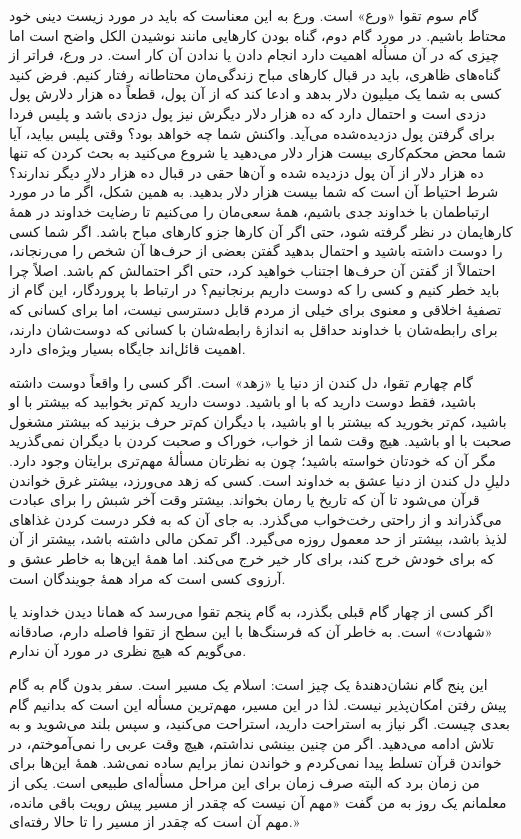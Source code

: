 گام سوم تقوا «ورع» است. ورع به این معناست که باید در مورد زیست دینی خود محتاط باشیم. در مورد گام دوم، گناه بودن کارهایی مانند نوشیدن الکل واضح است اما چیزی که در آن مسأله اهمیت دارد انجام دادن یا ندادن آن کار است. در ورع، فراتر از گناه‌های ظاهری، باید در قبال  کارهای مباح زندگی‌مان محتاطانه رفتار کنیم. فرض کنید کسی به شما یک میلیون دلار بدهد و ادعا کند که از آن پول، قطعاً ده هزار دلارش پول دزدی است و احتمال دارد که ده هزار دلار دیگرش نیز پول دزدی باشد و پلیس فردا برای گرفتن پول دزدیده‌شده می‌آید. واکنش شما چه خواهد بود؟ وقتی پلیس بیاید، آیا شما محض محکم‌کاری بیست هزار دلار می‌دهید یا شروع می‌کنید به بحث کردن که تنها ده هزار دلار از آن پول دزدیده شده و آن‌ها حقی در قبال ده هزار دلارِ دیگر ندارند؟ شرط احتیاط آن است که شما بیست هزار دلار بدهید. به همین شکل، اگر ما در مورد ارتباطمان با خداوند جدی باشیم، همهٔ سعی‌مان را می‌کنیم تا رضایت خداوند در همهٔ کارهایمان در نظر گرفته شود، حتی اگر آن کارها جزو کارهای مباح باشد. اگر شما کسی را دوست داشته باشید و احتمال بدهید گفتن بعضی از حرف‌ها آن شخص را می‌رنجاند، احتمالاً از گفتن آن حرف‌ها اجتناب خواهید کرد، حتی اگر احتمالش کم باشد. اصلاً چرا باید خطر کنیم و کسی را که دوست داریم برنجانیم؟ در ارتباط با پروردگار، این گام از تصفیهٔ اخلاقی و معنوی برای خیلی از مردم قابل دسترسی نیست، اما برای کسانی که برای  رابطه‌شان با خداوند حداقل به اندازهٔ رابطه‌شان با کسانی که دوست‌شان دارند، اهمیت قائل‌اند جایگاه بسیار ویژه‌ای دارد.

گام چهارم تقوا، دل کندن از دنیا یا «زهد» است. اگر کسی را واقعاً دوست داشته باشید، فقط دوست دارید که با او باشید. دوست دارید کم‌تر بخوابید که بیشتر با او باشید، کم‌تر بخورید که بیشتر با او باشید، با دیگران کم‌تر حرف بزنید که بیشتر مشغول صحبت با او باشید. هیچ وقت شما از خواب، خوراک و صحبت کردن‌ با دیگران نمی‌گذرید مگر آن که خودتان خواسته باشید؛ چون به نظرتان مسألهٔ مهم‌تری برایتان وجود دارد. دلیلِ دل کندن از دنیا عشق به خداوند است. کسی که زهد می‌ورزد، بیشتر غرق خواندن قرآن می‌شود تا آن که تاریخ یا رمان بخواند. بیشتر وقت آخر شبش را برای عبادت می‌گذراند و از راحتی رخت‌خواب می‌گذرد. به جای آن که به فکر درست کردن غذاهای لذیذ باشد، بیشتر از حد معمول روزه می‌گیرد. اگر تمکن مالی داشته باشد، بیشتر از آن که برای خودش خرج کند، برای کار خیر خرج می‌کند. اما همهٔ این‌ها به خاطر عشق و آرزوی کسی است که مراد همهٔ جویندگان است.

اگر کسی از چهار گام قبلی بگذرد، به گام پنجم تقوا می‌رسد که همانا دیدن خداوند یا «شهادت» است. به خاطر آن که فرسنگ‌ها با این سطح از تقوا فاصله دارم، صادقانه می‌گویم که هیچ نظری در مورد آن ندارم. 

این پنج گام نشان‌دهندهٔ یک چیز است: اسلام یک مسیر است. سفر بدون گام به گام پیش رفتن امکان‌پذیر نیست. لذا در این مسیر، مهم‌ترین مسأله این است که  بدانیم گام بعدی چیست. اگر نیاز به استراحت دارید،‌ استراحت می‌کنید، و سپس بلند می‌شوید و به تلاش ادامه می‌دهید. اگر من چنین بینشی نداشتم، هیچ وقت عربی را نمی‌آموختم، در خواندن قرآن تسلط پیدا نمی‌کردم و خواندن نماز برایم ساده نمی‌شد. همهٔ این‌ها برای من زمان برد که البته صرف زمان برای این مراحل مسأله‌ای طبیعی است. یکی از معلمانم یک روز به من گفت «مهم آن نیست که چقدر از مسیر پیش رویت باقی مانده، مهم آن است که چقدر از مسیر را تا حالا رفته‌ای.»









